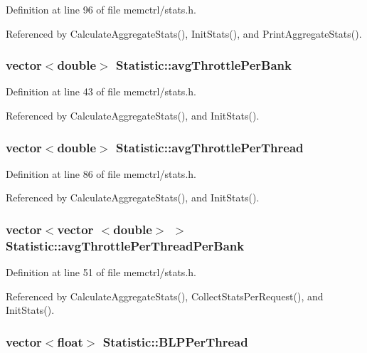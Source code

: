 Definition at line 96 of file memctrl/stats.h.

Referenced by CalculateAggregateStats(), InitStats(), and PrintAggregateStats().
\subsubsection[{avgThrottlePerBank}]{\setlength{\rightskip}{0pt plus 5cm}vector$<$double$>$ {\bf Statistic::avgThrottlePerBank}}\label{classStatistic_324ea22609d5e74a5b525a188d76f41b}




Definition at line 43 of file memctrl/stats.h.

Referenced by CalculateAggregateStats(), and InitStats().
\subsubsection[{avgThrottlePerThread}]{\setlength{\rightskip}{0pt plus 5cm}vector$<$double$>$ {\bf Statistic::avgThrottlePerThread}}\label{classStatistic_2423f865ea3bcf4cd1264c4319defec7}




Definition at line 86 of file memctrl/stats.h.

Referenced by CalculateAggregateStats(), and InitStats().
\subsubsection[{avgThrottlePerThreadPerBank}]{\setlength{\rightskip}{0pt plus 5cm}vector$<$vector $<$double$>$ $>$ {\bf Statistic::avgThrottlePerThreadPerBank}}\label{classStatistic_cc64d26078b0344d886bc704ac9d005d}




Definition at line 51 of file memctrl/stats.h.

Referenced by CalculateAggregateStats(), CollectStatsPerRequest(), and InitStats().
\subsubsection[{BLPPerThread}]{\setlength{\rightskip}{0pt plus 5cm}vector$<$float$>$ {\bf Statistic::BLPPerThread}}\label{classStatistic_5250d7a70bca54a07b2653c8bfdad3bb}





